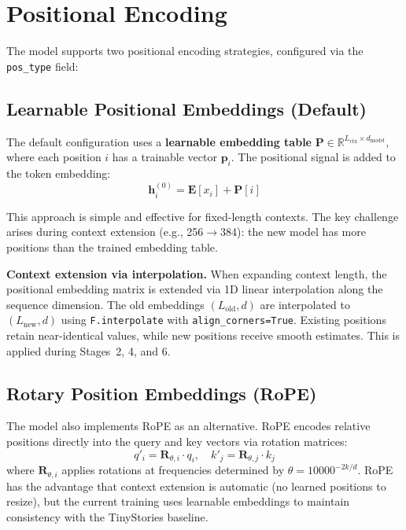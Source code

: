 \section{Positional Encoding}
\label{sec:posenc}

The model supports two positional encoding strategies, configured via the
\texttt{pos\_type} field:

\subsection{Learnable Positional Embeddings (Default)}

The default configuration uses a \textbf{learnable embedding table}
$\mathbf{P} \in \mathbb{R}^{L_\text{ctx} \times d_\text{model}}$, where each
position $i$ has a trainable vector $\mathbf{p}_i$.  The positional signal is
added to the token embedding:
\[
\mathbf{h}_i^{(0)} = \mathbf{E}[x_i] + \mathbf{P}[i]
\]

This approach is simple and effective for fixed-length contexts.  The key
challenge arises during context extension (e.g., 256$\to$384): the new model
has more positions than the trained embedding table.

\textbf{Context extension via interpolation.}
When expanding context length, the positional embedding matrix is extended via
1D linear interpolation along the sequence dimension.  The old embeddings
$(L_\text{old}, d)$ are interpolated to $(L_\text{new}, d)$ using
\texttt{F.interpolate} with \texttt{align\_corners=True}.  Existing positions
retain near-identical values, while new positions receive smooth estimates.
This is applied during Stages~2, 4, and 6.

\subsection{Rotary Position Embeddings (RoPE)}

The model also implements RoPE as an alternative.  RoPE encodes relative
positions directly into the query and key vectors via rotation matrices:
\[
q'_i = \mathbf{R}_{\theta,i} \cdot q_i, \quad k'_j = \mathbf{R}_{\theta,j} \cdot k_j
\]
where $\mathbf{R}_{\theta,i}$ applies rotations at frequencies determined by
$\theta = 10000^{-2k/d}$.  RoPE has the advantage that context extension is
automatic (no learned positions to resize), but the current training uses
learnable embeddings to maintain consistency with the TinyStories baseline.

